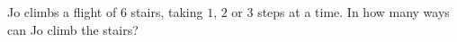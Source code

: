 Jo climbs a flight of $6$ stairs, taking $1$, $2$ or $3$ steps at a time. In how many ways can Jo climb the stairs?
